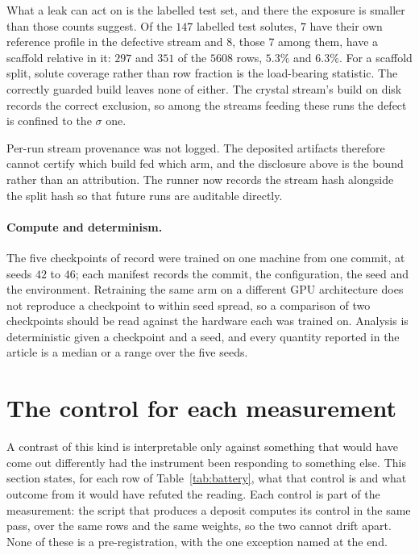 What a leak can act on is the labelled test set, and there the exposure is smaller than those
counts suggest. Of the $147$ labelled test solutes, $7$ have their own reference profile in the
defective stream and $8$, those $7$ among them, have a scaffold relative in it: $297$ and $351$ of
the $5608$ rows, $5.3\%$ and $6.3\%$. For a scaffold split, solute coverage rather than row
fraction is the load-bearing statistic. The correctly guarded build leaves none of either. The
crystal stream's build on disk records the correct exclusion, so among the streams feeding these
runs the defect is confined to the $\sigma$ one.

Per-run stream provenance was not logged. The deposited artifacts therefore cannot certify which
build fed which arm, and the disclosure above is the bound rather than an attribution. The runner
now records the stream hash alongside the split hash so that future runs are auditable directly.

\paragraph{Compute and determinism.}
The five checkpoints of record were trained on one machine from one commit, at seeds $42$ to $46$;
each manifest records the commit, the configuration, the seed and the environment. Retraining the
same arm on a different GPU architecture does not reproduce a checkpoint to within seed spread, so
a comparison of two checkpoints should be read against the hardware each was trained on. Analysis
is deterministic given a checkpoint and a seed, and every quantity reported in the article is a
median or a range over the five seeds.



\section{The control for each measurement}
\label{si:rules}

A contrast of this kind is interpretable only against something that would have come out
differently had the instrument been responding to something else. This section states, for each
row of Table~\ref{tab:battery}, what that control is and what outcome from it would have refuted
the reading. Each control is part of the measurement: the script that produces a deposit computes
its control in the same pass, over the same rows and the same weights, so the two cannot drift
apart. None of these is a pre-registration, with the one exception named at the end.

